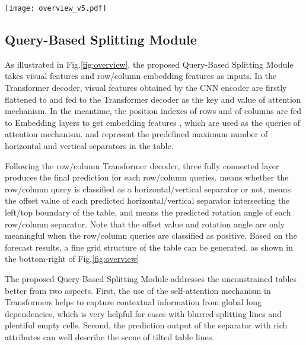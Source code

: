 \documentclass[lettersize,journal]{IEEEtran}
\begin{document}
\begin{figure*}
\begin{center}
\texttt{[image: overview\_v5.pdf]}
\end{center}
\caption{An overview of the proposed TRUST. It consists of a CNN backbone, a Query-Based Splitting Module, and a Vertex-based Merging Module. The features of row/column separators are extracted and then generate row splitting lines and column splitting lines, forming a fine grid structure by the Query-Based Splitting Module. The row/column features are further fed into the Vertex-based Merging Module to predict the linking relations between adjacent basic cells}
\label{fig:overview}
\end{figure*}

\subsection{Query-Based Splitting Module}
As illustrated in Fig.\ref{fig:overview}, the proposed Query-Based Splitting Module takes visual features and row/column embedding features as inputs. In the Transformer decoder, visual features  obtained by the CNN encoder are firstly flattened to  and fed to the Transformer decoder as the key and value of attention mechanism. In the meantime, the position indexes  of rows and  of columns are fed to Embedding layers to get embedding features , which are used as the queries of attention mechanism.  and  represent the predefined maximum number of horizontal and vertical separators in the table.

Following the row/column Transformer decoder, three fully connected layer produces the final prediction  for each row/column queries.  means whether the row/column query is classified as a horizontal/vertical separator or not,  means the offset value of each predicted horizontal/vertical separator intersecting the left/top boundary of the table, and  means the predicted rotation angle of each row/column separator. Note that the offset value and rotation angle are only meaningful when the row/column queries are classified as positive. Based on the forecast results, a fine grid structure of the table can be generated, as shown in the bottom-right of Fig.\ref{fig:overview}

The proposed Query-Based Splitting Module addresses the unconstrained tables better from two aspects. First, the use of the self-attention mechanism in Transformers helps to capture contextual information from global long dependencies, which is very helpful for cases with blurred splitting lines and plentiful empty cells. Second, the prediction output of the separator with rich attributes can well describe the scene of tilted table lines.
\end{document}
